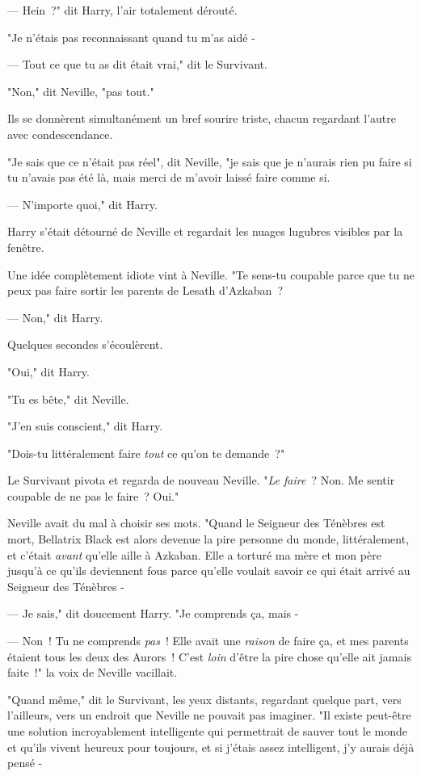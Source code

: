 --- Hein~?" dit Harry, l'air totalement dérouté.

"Je n'étais pas reconnaissant quand tu m'as aidé -

--- Tout ce que tu as dit était vrai," dit le Survivant.

"Non," dit Neville, "pas tout."

Ils se donnèrent simultanément un bref sourire triste, chacun regardant l'autre avec condescendance.

"Je sais que ce n'était pas réel", dit Neville, "je sais que je n'aurais rien pu faire si tu n'avais pas été là, mais merci de m'avoir laissé faire comme si.

--- N'importe quoi," dit Harry.

Harry s'était détourné de Neville et regardait les nuages lugubres visibles par la fenêtre.

Une idée complètement idiote vint à Neville. "Te sens-tu coupable parce que tu ne peux pas faire sortir les parents de Lesath d'Azkaban~?

--- Non," dit Harry.

Quelques secondes s'écoulèrent.

"Oui," dit Harry.

"Tu es bête," dit Neville.

"J'en suis conscient," dit Harry.

"Dois-tu littéralement faire \emph{tout} ce qu'on te demande~?"

Le Survivant pivota et regarda de nouveau Neville. "\emph{Le faire}~? Non. Me sentir coupable de ne pas le faire~? Oui."

Neville avait du mal à choisir ses mots. "Quand le Seigneur des Ténèbres est mort, Bellatrix Black est alors devenue la pire personne du monde, littéralement, et c'était \emph{avant} qu'elle aille à Azkaban. Elle a torturé ma mère et mon père jusqu'à ce qu'ils deviennent fous parce qu'elle voulait savoir ce qui était arrivé au Seigneur des Ténèbres -

--- Je sais," dit doucement Harry. "Je comprends ça, mais -

--- Non~! Tu ne comprends \emph{pas}~! Elle avait une \emph{raison} de faire ça, et mes parents étaient tous les deux des Aurors~! C'est \emph{loin} d'être la pire chose qu'elle ait jamais faite~!" la voix de Neville vacillait.

"Quand même," dit le Survivant, les yeux distants, regardant quelque part, vers l'ailleurs, vers un endroit que Neville ne pouvait pas imaginer. "Il existe peut-être une solution incroyablement intelligente qui permettrait de sauver tout le monde et qu'ils vivent heureux pour toujours, et si j'étais assez intelligent, j'y aurais déjà pensé -

